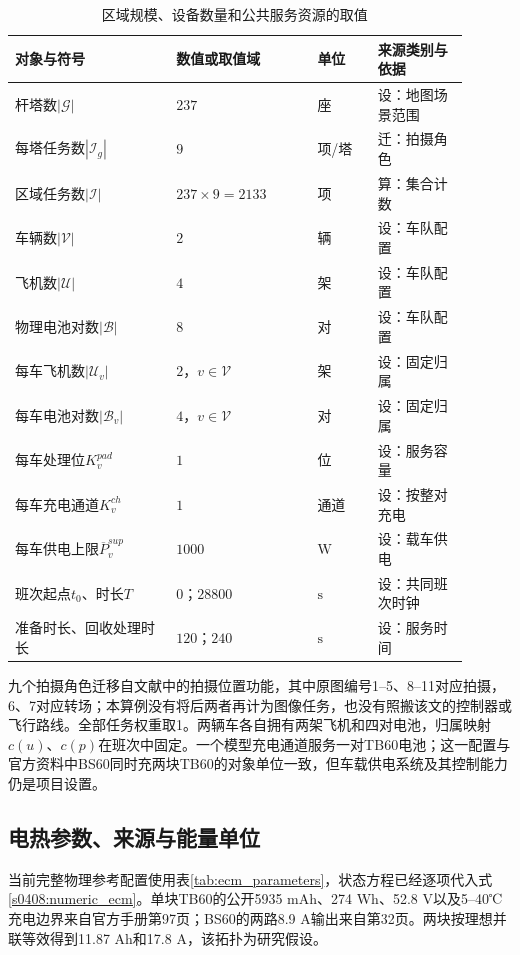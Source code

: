 \begin{table}[htbp]
\centering\small
\caption{区域规模、设备数量和公共服务资源的取值}
\label{s0601:fleet_parameters}
\begin{tabular}{@{}p{0.32\linewidth}p{0.28\linewidth}p{0.12\linewidth}p{0.18\linewidth}@{}}
\toprule
对象与符号 & 数值或取值域 & 单位 & 来源类别与依据\\
\midrule
杆塔数$|\mathcal G|$ & $237$ & 座 & 设：地图场景范围\\
每塔任务数$|\mathcal I_g|$ & $9$ & 项/塔 & 迁：拍摄角色\\
区域任务数$|\mathcal I|$ & $237\times9=2133$ & 项 & 算：集合计数\\
车辆数$|\mathcal V|$ & $2$ & 辆 & 设：车队配置\\
飞机数$|\mathcal U|$ & $4$ & 架 & 设：车队配置\\
物理电池对数$|\mathcal B|$ & $8$ & 对 & 设：车队配置\\
每车飞机数$|\mathcal U_v|$ & $2$，$v\in\mathcal V$ & 架 & 设：固定归属\\
每车电池对数$|\mathcal B_v|$ & $4$，$v\in\mathcal V$ & 对 & 设：固定归属\\
每车处理位$K_v^{pad}$ & $1$ & 位 & 设：服务容量\\
每车充电通道$K_v^{ch}$ & $1$ & 通道 & 设：按整对充电\\
每车供电上限$\overline P_v^{sup}$ & $1000$ & $\mathrm W$ & 设：载车供电\\
班次起点$t_0$、时长$T$ & $0$；$28800$ & $\mathrm s$ & 设：共同班次时钟\\
准备时长、回收处理时长 & $120$；$240$ & $\mathrm s$ & 设：服务时间\\
\bottomrule
\end{tabular}
\end{table}

九个拍摄角色迁移自文献\cite{LiInspection2023}中的拍摄位置功能，其中原图编号1--5、8--11对应拍摄，6、7对应转场；本算例没有将后两者再计为图像任务，也没有照搬该文的控制器或飞行路线。全部任务权重取1。两辆车各自拥有两架飞机和四对电池，归属映射$c(u)$、$c(p)$在班次中固定。一个模型充电通道服务一对TB60电池；这一配置与官方资料中BS60同时充两块TB60的对象单位一致，但车载供电系统及其控制能力仍是项目设置\cite{DJITB60}。

\subsection{电热参数、来源与能量单位}

当前完整物理参考配置使用表\ref{tab:ecm_parameters}，状态方程已经逐项代入式\eqref{s0408:numeric_ecm}。单块TB60的公开5935 mAh、274 Wh、52.8 V以及5--40℃充电边界来自官方手册第97页；BS60的两路8.9 A输出来自第32页\cite{DJIM300Manual}。两块按理想并联等效得到11.87 Ah和17.8 A，该拓扑为研究假设。

